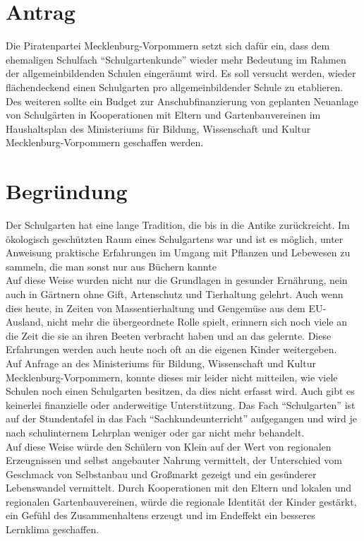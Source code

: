 \section{Antrag}

Die Piratenpartei Mecklenburg-Vorpommern setzt sich dafür ein, dass dem ehemaligen Schulfach ``Schulgartenkunde'' wieder mehr Bedeutung im Rahmen der allgemeinbildenden Schulen eingeräumt wird. Es soll versucht werden, wieder flächendeckend einen Schulgarten pro allgemeinbildender Schule zu etablieren.\\Des weiteren sollte ein Budget zur Anschubfinanzierung von geplanten Neuanlage von Schulgärten in Kooperationen mit Eltern und Gartenbauvereinen im Haushaltsplan des Ministeriums für Bildung, Wissenschaft und Kultur Mecklenburg-Vorpommern geschaffen werden.

\section{Begründung}

Der Schulgarten hat eine lange Tradition, die bis in die Antike zurückreicht. Im ökologisch geschützten Raum eines Schulgartens war und ist es möglich, unter Anweisung praktische Erfahrungen im Umgang mit Pflanzen und Lebewesen zu sammeln, die man sonst nur aus Büchern kannte\\Auf diese Weise wurden nicht nur die Grundlagen in gesunder Ernährung, nein auch in Gärtnern ohne Gift, Artenschutz und Tierhaltung gelehrt. Auch wenn dies heute, in Zeiten von Massentierhaltung und Gengemüse aus dem EU-Ausland, nicht mehr die übergeordnete Rolle spielt, erinnern sich noch viele an die Zeit die sie an ihren Beeten verbracht haben und an das gelernte. Diese Erfahrungen werden auch heute noch oft an die eigenen Kinder weitergeben.\\Auf Anfrage an des Ministeriums für Bildung, Wissenschaft und Kultur Mecklenburg-Vorpommern, konnte dieses mir leider nicht mitteilen, wie viele Schulen noch einen Schulgarten besitzen, da dies nicht erfasst wird. Auch gibt es keinerlei finanzielle oder anderweitige Unterstützung. Das Fach ``Schulgarten'' ist auf der Stundentafel in das Fach ``Sachkundeunterricht'' aufgegangen und wird je nach schulinternem Lehrplan weniger oder gar nicht mehr behandelt.\\Auf diese Weise würde den Schülern von Klein auf der Wert von regionalen Erzeugnissen und selbst angebauter Nahrung vermittelt, der Unterschied vom Geschmack von Selbstanbau und Großmarkt gezeigt und ein gesünderer Lebenswandel vermittelt. Durch Kooperationen mit den Eltern und lokalen und regionalen Gartenbauvereinen, würde die regionale Identität der Kinder gestärkt, ein Gefühl des Zusammenhaltens erzeugt und im Endeffekt ein besseres Lernklima geschaffen.

